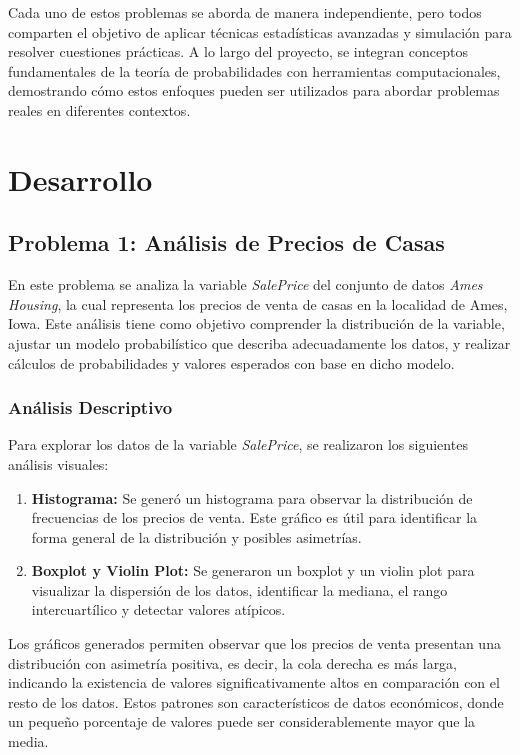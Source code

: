 \documentclass[12pt]{article}
\begin{document}
Cada uno de estos problemas se aborda de manera independiente, pero todos comparten el objetivo de aplicar técnicas estadísticas avanzadas y simulación para resolver cuestiones prácticas. A lo largo del proyecto, se integran conceptos fundamentales de la teoría de probabilidades con herramientas computacionales, demostrando cómo estos enfoques pueden ser utilizados para abordar problemas reales en diferentes contextos.



\newpage

\section{Desarrollo}
\subsection{Problema 1: Análisis de Precios de Casas}
En este problema se analiza la variable \textit{SalePrice} del conjunto de datos \textit{Ames Housing}, la cual representa los precios de venta de casas en la localidad de Ames, Iowa. Este análisis tiene como objetivo comprender la distribución de la variable, ajustar un modelo probabilístico que describa adecuadamente los datos, y realizar cálculos de probabilidades y valores esperados con base en dicho modelo.

\subsubsection{Análisis Descriptivo}
Para explorar los datos de la variable \textit{SalePrice}, se realizaron los siguientes análisis visuales:
\begin{enumerate}
    \item \textbf{Histograma:} Se generó un histograma para observar la distribución de frecuencias de los precios de venta. Este gráfico es útil para identificar la forma general de la distribución y posibles asimetrías.
    \item \textbf{Boxplot y Violin Plot:} Se generaron un boxplot y un violin plot para visualizar la dispersión de los datos, identificar la mediana, el rango intercuartílico y detectar valores atípicos.
\end{enumerate}

Los gráficos generados permiten observar que los precios de venta presentan una distribución con asimetría positiva, es decir, la cola derecha es más larga, indicando la existencia de valores significativamente altos en comparación con el resto de los datos. Estos patrones son característicos de datos económicos, donde un pequeño porcentaje de valores puede ser considerablemente mayor que la media.
\end{document}
